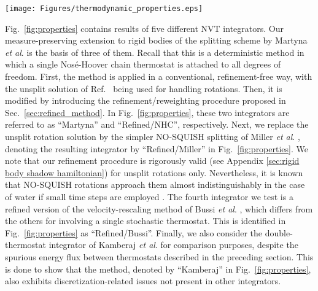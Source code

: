 \documentclass[
	aip,
	jcp,
	reprint,
]{revtex4-1}
\begin{document}
\begin{figure*}
	\texttt{[image: Figures/thermodynamic\_properties.eps]}
	\caption{Effect of the time-step size on (a) the estimated temperature, (b) the mean potential energy per molecule, (c) the mean internal virial per molecule, and (d)
the constant-volume specific heat, as obtained for a system of 903 TIP3P\cite{Jorgensen_1983} water molecules in NVT MD simulations employing different numerical schemes: ``Martyna'' corresponds to our implementation for rigid bodies of the Nos\'{e}-Hoover chain thermostat introduced in Ref.~ (red circles), the ``Refined/NHC'' scheme (black squares) is obtained by refining ``Martyna'', as described in Sec.~\ref{sec:refined_method}, ``Refined/NHC/Miller'' (pink up triangles) differs from this last one in that it employs the approximate solution of free rotations\cite{Miller_2002}, ``Refined/Bussi'' (green x) stands for a refined version of the stochastic method of Bussi \textit{et al}. \cite{Bussi_2007}  and, finally, ``Kamberaj'' (blue down triangles) refers to the double-thermostat introduced by Kamberaj \textit{et al.} \cite{Kamberaj_2005}  .}
	\label{fig:properties}
\end{figure*}

Fig.~\ref{fig:properties} contains results of five different NVT integrators.
Our measure-preserving extension to rigid bodies of the splitting scheme by Martyna \textit{et al}. \cite{Martyna_1996} is the basis of three of them.
Recall that this is a deterministic method in which a single Nos\'{e}-Hoover chain thermostat \cite{Martyna_1992} is attached to all degrees of freedom.
First, the method is applied in a conventional, refinement-free way, with the unsplit solution of Ref.~ being used for handling rotations.
Then, it is modified by introducing the refinement/reweighting procedure proposed in Sec.~\ref{sec:refined_method}.
In Fig.~\ref{fig:properties}, these two integrators are referred to as ``Martyna'' and ``Refined/NHC'', respectively.
Next, we replace the unsplit rotation solution by the simpler NO-SQUISH splitting of Miller \textit{et al}. \cite{Miller_2002}, denoting the resulting integrator by ``Refined/Miller'' in Fig.~\ref{fig:properties}.
We note that our refinement procedure is rigorously valid (see Appendix \ref{sec:rigid body shadow hamiltonian}) for unsplit rotations only.
Nevertheless, it is known that NO-SQUISH rotations approach them almost indistinguishably in the case of water if small time steps are employed \cite{Silveira_2017}.
The fourth integrator we test is a refined version of the velocity-rescaling method of Bussi \textit{et al}. \cite{Bussi_2007}, which differs from the others for involving a single stochastic thermostat.
This is identified in Fig.~\ref{fig:properties} as ``Refined/Bussi''.
Finally, we also consider the double-thermostat integrator of Kamberaj \textit{et al}. \cite{Kamberaj_2005} for comparison purposes, despite the spurious energy flux between thermostats described in the preceding section.
This is done to show that the method, denoted by ``Kamberaj'' in Fig.~\ref{fig:properties}, also exhibits discretization-related issues not present in other integrators.
\end{document}
